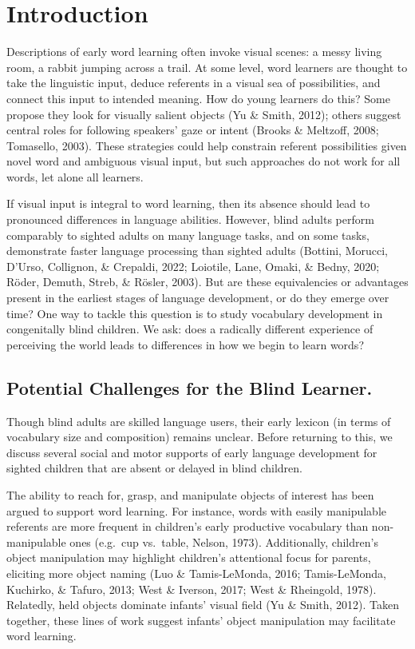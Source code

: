 \documentclass[english,man,floatsintext]{apa6}
\begin{document}
\hypertarget{introduction}{%
\section{Introduction}\label{introduction}}

Descriptions of early word learning often invoke visual scenes: a messy living room, a rabbit jumping across a trail. At some level, word learners are thought to take the linguistic input, deduce referents in a visual sea of possibilities, and connect this input to intended meaning. How do young learners do this? Some propose they look for visually salient objects (Yu \& Smith, 2012); others suggest central roles for following speakers' gaze or intent (Brooks \& Meltzoff, 2008; Tomasello, 2003). These strategies could help constrain referent possibilities given novel word and ambiguous visual input, but such approaches do not work for all words, let alone all learners.

If visual input is integral to word learning, then its absence should lead to pronounced differences in language abilities. However, blind adults perform comparably to sighted adults on many language tasks, and on some tasks, demonstrate faster language processing than sighted adults (Bottini, Morucci, D'Urso, Collignon, \& Crepaldi, 2022; Loiotile, Lane, Omaki, \& Bedny, 2020; Röder, Demuth, Streb, \& Rösler, 2003). But are these equivalencies or advantages present in the earliest stages of language development, or do they emerge over time? One way to tackle this question is to study vocabulary development in congenitally blind children. We ask: does a radically different experience of perceiving the world leads to differences in how we begin to learn words?

\hypertarget{potential-challenges-for-the-blind-learner.}{%
\subsection{Potential Challenges for the Blind Learner.}\label{potential-challenges-for-the-blind-learner.}}

Though blind adults are skilled language users, their early lexicon (in terms of vocabulary size and composition) remains unclear. Before returning to this, we discuss several social and motor supports of early language development for sighted children that are absent or delayed in blind children.

The ability to reach for, grasp, and manipulate objects of interest has been argued to support word learning. For instance, words with easily manipulable referents are more frequent in children's early productive vocabulary than non-manipulable ones (e.g.~cup vs.~table, Nelson, 1973). Additionally, children's object manipulation may highlight children's attentional focus for parents, eliciting more object naming (Luo \& Tamis-LeMonda, 2016; Tamis-LeMonda, Kuchirko, \& Tafuro, 2013; West \& Iverson, 2017; West \& Rheingold, 1978). Relatedly, held objects dominate infants' visual field (Yu \& Smith, 2012). Taken together, these lines of work suggest infants' object manipulation may facilitate word learning.
\end{document}
